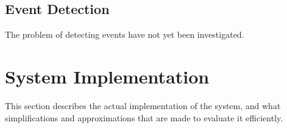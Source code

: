 \subsection{Event Detection}
The problem of detecting events have not yet been investigated.

\section{System Implementation}
This section describes the actual implementation of the system, and
what simplifications and approximations that are made to evaluate it efficiently.

